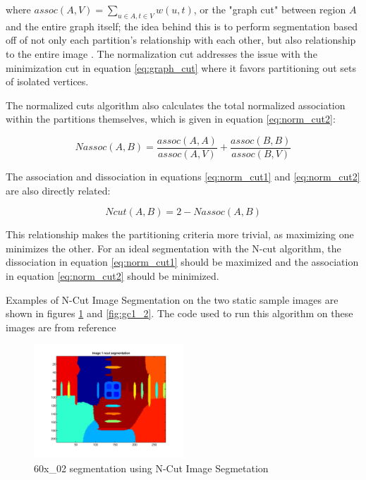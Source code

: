 \documentclass{article}
\begin{document}
where $assoc(A,V) = \sum_{u\in A, t\in V} w(u,t)$, or the "graph cut" between region $A$ and the entire graph itself; the idea behind this is to perform segmentation based off of not only each partition's relationship with each other, but also relationship to the entire image \cite{ncut}. The normalization cut addresses the issue with the minimization cut in equation \ref{eq:graph_cut} where it favors partitioning out sets of isolated vertices.

The normalized cuts algorithm also calculates the total normalized association within the partitions themselves, which is given in equation \ref{eq:norm_cut2}: \cite{ncut}

\begin{equation}
Nassoc(A,B) = \frac{assoc(A,A)}{assoc(A,V)} + \frac{assoc(B,B)}{assoc(B,V)}
\label{eq:norm_cut2}
\end{equation}

The association and dissociation in equations \ref{eq:norm_cut1} and \ref{eq:norm_cut2} are also directly related: \cite{ncut}

\begin{equation}
Ncut(A,B) = 2 - Nassoc(A,B)
\end{equation}

This relationship makes the partitioning criteria more trivial, as maximizing one minimizes the other. For an ideal segmentation with the N-cut algorithm, the dissociation in equation \ref{eq:norm_cut1} should be maximized and the association in equation \ref{eq:norm_cut2} should be minimized.


Examples of N-Cut Image Segmentation on the two static sample images are shown in figures \ref{fig:gc1_1} and \ref{fig:gc1_2}. The code used to run this algorithm on these images are from reference \cite{ncut_code}

\pagebreak
\begin{figure}
\centering
\includegraphics[width=0.5\textwidth]{figures/60x_02_gc1.pdf}
\caption{60x\_02 segmentation using N-Cut Image Segmetation}
\label{fig:gc1_1}
\end{figure}
\end{document}
